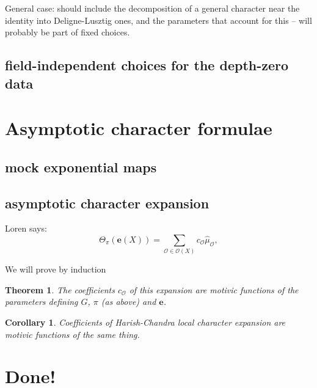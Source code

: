 \documentclass[12pt]{amsart}
\newcommand{\cO}{\mathcal{O}}
\newcommand{\mexp}{\mathbf{e}}
\def\cO{\mathcal{O}}
\theoremstyle{plain}
\newtheorem{theorem}[thm]{Theorem}
\newtheorem{cor}[thm]{Corollary}
\theoremstyle{definition}
\begin{document}
General case: should include the decomposition of a general character near the identity into Deligne-Lusztig ones, and the parameters that account for this -- will probably be part of fixed choices. 

\subsection{field-independent choices for the depth-zero data}


\section{Asymptotic character formulae}
\subsection{mock exponential maps}

\subsection{asymptotic character expansion}
Loren says:
$$\Theta_\pi(\mexp(X))= \sum_{\cO\in \cO(X)} c_\cO\widehat\mu_{\cO},$$


We will prove by induction
\begin{theorem} The coefficients $c_{\cO}$ of this expansion are motivic functions of the parameters defining $G$, $\pi$ (as above) and $\mexp$. 
\end{theorem}

\begin{cor}
Coefficients of Harish-Chandra local character expansion are motivic functions of the same thing.
\end{cor}

\section{Done!}
\end{document}

